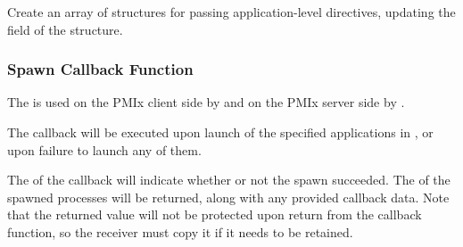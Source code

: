 \begin{arglist}
\end{arglist}


Create an array of  structures for passing application-level directives, updating the  field of the  structure.


\begin{arglist}
\end{arglist}


\subsubsection{Spawn Callback Function}

\summary

The  is used on the PMIx client side by  and on the PMIx server side by .


\begin{arglist}
\end{arglist}


\descr

The callback will be executed upon launch of the specified applications in , or upon failure to launch any of them.

The  of the callback will indicate whether or not the spawn succeeded.
The  of the spawned processes will be returned, along with any provided callback data.
Note that the returned  value will not be protected upon return from the callback function, so the receiver must copy it if it needs to be retained.


